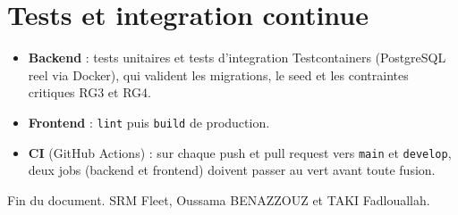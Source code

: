 \documentclass[11pt]{article}
\begin{document}
\section{Tests et integration continue}
\begin{itemize}
  \item \textbf{Backend} : tests unitaires et tests d'integration Testcontainers (PostgreSQL reel via
        Docker), qui valident les migrations, le seed et les contraintes critiques RG3 et RG4.
  \item \textbf{Frontend} : \texttt{lint} puis \texttt{build} de production.
  \item \textbf{CI} (GitHub Actions) : sur chaque push et pull request vers \texttt{main} et
        \texttt{develop}, deux jobs (backend et frontend) doivent passer au vert avant toute fusion.
\end{itemize}

\vspace{0.4cm}
\srmrule
\begin{center}\small\textcolor{srmslate}{Fin du document. SRM Fleet, Oussama BENAZZOUZ et TAKI Fadlouallah.}\end{center}
\end{document}
